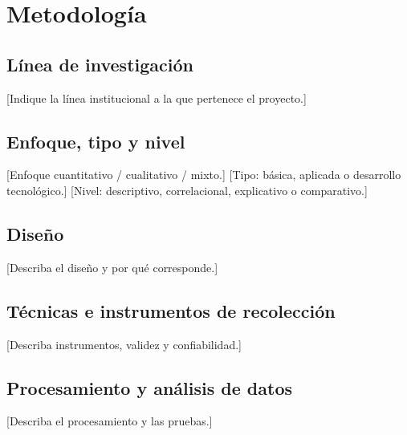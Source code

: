 \section{Metodología}

\subsection{Línea de investigación}
[Indique la línea institucional a la que pertenece el proyecto.]

\subsection{Enfoque, tipo y nivel}
[Enfoque cuantitativo / cualitativo / mixto.]
[Tipo: básica, aplicada o desarrollo tecnológico.]
[Nivel: descriptivo, correlacional, explicativo o comparativo.]

\subsection{Diseño}
[Describa el diseño y por qué corresponde.]

\subsection{Técnicas e instrumentos de recolección}
[Describa instrumentos, validez y confiabilidad.]

\subsection{Procesamiento y análisis de datos}
[Describa el procesamiento y las pruebas.]
